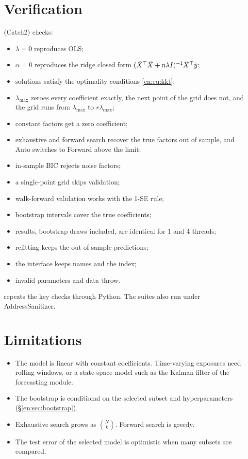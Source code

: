 \section{Verification}
 (Catch2) checks:
\begin{itemize}
  \item $\lambda=0$ reproduces OLS;
  \item $\alpha=0$ reproduces the ridge closed form $(\tilde X^\top\tilde X+n\lambda I)^{-1}\tilde X^\top\tilde y$;
  \item solutions satisfy the optimality conditions \eqref{en:eq:kkt};
  \item $\lambda_{\max}$ zeroes every coefficient exactly, the next point of the grid does
        not, and the grid runs from $\lambda_{\max}$ to $r\lambda_{\max}$;
  \item constant factors get a zero coefficient;
  \item exhaustive and forward search recover the true factors out of sample, and Auto
        switches to Forward above the limit;
  \item in-sample BIC rejects noise factors;
  \item a single-point grid skips validation;
  \item walk-forward validation works with the 1-SE rule;
  \item bootstrap intervals cover the true coefficients;
  \item results, bootstrap draws included, are identical for 1 and 4 threads;
  \item refitting keeps the out-of-sample predictions;
  \item the  interface keeps names and the index;
  \item invalid parameters and data throw.
\end{itemize}
 repeats the key checks through Python.
The suites also run under AddressSanitizer.

\section{Limitations}
\begin{itemize}
  \item The model is linear with constant coefficients. Time-varying exposures need rolling
        windows, or a state-space model such as the Kalman filter of the forecasting module.
  \item The bootstrap is conditional on the selected subset and hyperparameters
        (\S\ref{en:sec:bootstrap}).
  \item Exhaustive search grows as $\binom Nk$. Forward search is greedy.
  \item The test error of the selected model is optimistic when many subsets are compared.
\end{itemize}

